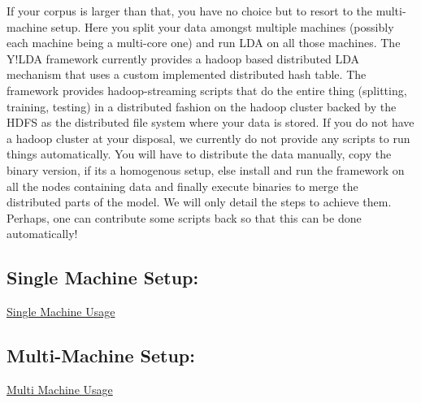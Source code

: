 If your corpus is larger than that, you have no choice but to resort to the multi-\/machine setup. Here you split your data amongst multiple machines (possibly each machine being a multi-\/core one) and run LDA on all those machines. The Y!LDA framework currently provides a hadoop based distributed LDA mechanism that uses a custom implemented distributed hash table. The framework provides hadoop-\/streaming scripts that do the entire thing (splitting, training, testing) in a distributed fashion on the hadoop cluster backed by the HDFS as the distributed file system where your data is stored. If you do not have a hadoop cluster at your disposal, we currently do not provide any scripts to run things automatically. You will have to distribute the data manually, copy the binary version, if its a homogenous setup, else install and run the framework on all the nodes containing data and finally execute binaries to merge the distributed parts of the model. We will only detail the steps to achieve them. Perhaps, one can contribute some scripts back so that this can be done automatically! 

\par
  \subsection*{Single Machine Setup:}

\hyperlink{single__machine__usage}{Single Machine Usage} \subsection*{Multi-\/Machine Setup:}

\hyperlink{multi__machine__usage}{Multi Machine Usage} 